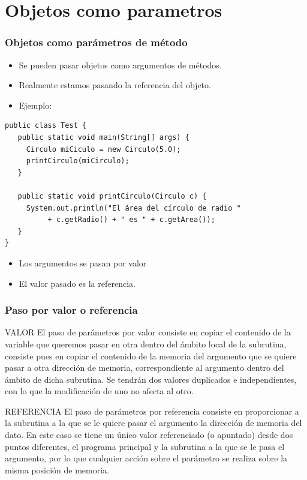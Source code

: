 \documentclass{beamer}
\begin{document}
\section{Objetos como parametros}

\begin{frame}[fragile]
    \frametitle{Objetos como parámetros de método}

\begin{itemize}[<+-| alert@+>]
      \item Se pueden pasar objetos como argumentos de métodos.
      \item Realmente estamos pasando la referencia del objeto.
      \item Ejemplo:    
\end{itemize}
\pause
\begin{verbatim}
public class Test {
   public static void main(String[] args) {
     Circulo miCiculo = new Circulo(5.0);
     printCirculo(miCirculo);
   }

   public static void printCirculo(Circulo c) {
     System.out.println("El área del círculo de radio "
          + c.getRadio() + " es " + c.getArea());
   }
}
\end{verbatim}
\pause
\begin{itemize}[<+-| alert@+>]
	\item Los argumentos se pasan por \alert{valor}
	\item El valor pasado es la referencia.
	\end{itemize}
\end{frame}


\begin{frame}[fragile]
    \frametitle{Paso por valor o referencia}
  \begin{block}{VALOR}
El paso de parámetros por valor consiste en copiar el contenido de la variable que queremos pasar en otra dentro del ámbito local de la subrutina, consiste pues en copiar el contenido de la memoria del argumento que se quiere pasar a otra dirección de memoria, correspondiente al argumento dentro del ámbito de dicha subrutina. Se tendrán dos valores duplicados e independientes, con lo que la modificación de uno no afecta al otro.
  \end{block}
  \pause
  \begin{block}{REFERENCIA}
El paso de parámetros por referencia consiste en proporcionar a la subrutina a la que se le quiere pasar el argumento la dirección de memoria del dato. En este caso se tiene un único valor referenciado (o apuntado) desde dos puntos diferentes, el programa principal y la subrutina a la que se le pasa el argumento, por lo que cualquier acción sobre el parámetro se realiza sobre la misma posición de memoria.
  \end{block}
\end{frame}
\end{document}
